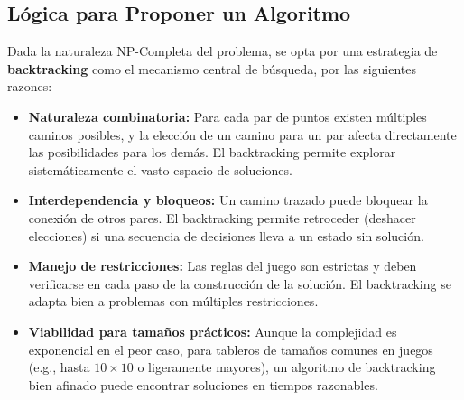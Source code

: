 \documentclass[spanish]{article}
\numberwithin{equation}{section}
\numberwithin{figure}{section}
\theoremstyle{definition}
\begin{document}
\subsection{Lógica para Proponer un Algoritmo}
Dada la naturaleza NP-Completa del problema, se opta por una estrategia de \textbf{backtracking} como el mecanismo central de búsqueda, por las siguientes razones:
\begin{itemize}
    \item \textbf{Naturaleza combinatoria:} Para cada par de puntos existen múltiples caminos posibles, y la elección de un camino para un par afecta directamente las posibilidades para los demás. El backtracking permite explorar sistemáticamente el vasto espacio de soluciones.
    \item \textbf{Interdependencia y bloqueos:} Un camino trazado puede bloquear la conexión de otros pares. El backtracking permite retroceder (deshacer elecciones) si una secuencia de decisiones lleva a un estado sin solución.
    \item \textbf{Manejo de restricciones:} Las reglas del juego son estrictas y deben verificarse en cada paso de la construcción de la solución. El backtracking se adapta bien a problemas con múltiples restricciones.
    \item \textbf{Viabilidad para tamaños prácticos:} Aunque la complejidad es exponencial en el peor caso, para tableros de tamaños comunes en juegos (e.g., hasta $10 \times 10$ o ligeramente mayores), un algoritmo de backtracking bien afinado puede encontrar soluciones en tiempos razonables.
\end{itemize}
\end{document}
